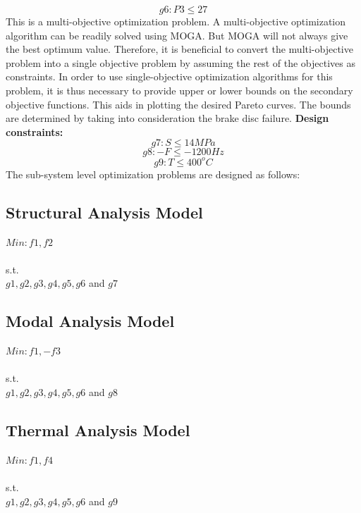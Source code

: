 \documentclass[12pt]{article}
\begin{document}
\begin{equation}
g6: P3 \le 27
\end{equation}
This is a multi-objective optimization problem. A multi-objective optimization algorithm can be readily solved using MOGA. But MOGA will not always give the best optimum value. Therefore, it is beneficial to convert the multi-objective problem into a single objective problem by assuming the rest of the objectives as constraints. In order to use single-objective optimization algorithms for this problem, it is thus necessary to provide upper or lower bounds on the secondary objective functions. This aids in plotting the desired Pareto curves. The bounds are determined by taking into consideration the brake disc failure.\newline\newline
\textbf{Design constraints:} 
\begin{equation}
g7: S \le 14 MPa
\label{7}
\end{equation}
\begin{equation}
g8: -F \le -1200 Hz
\label{8}
\end{equation}
\begin{equation}
g9: T \le 400^{o}C
\label{9}
\end{equation}
The sub-system level optimization problems are designed as follows:
\subsection{Structural Analysis Model}
$Min: f1, f2$\\\\
s.t.\\  $g1, g2, g3, g4, g5, g6$ and $g7$
\subsection{Modal Analysis Model}
$Min: f1, -f3$\\\\
s.t.\\  $g1, g2, g3, g4, g5, g6$ and $g8$
\subsection{Thermal Analysis Model}
$Min: f1, f4$\\\\
s.t.\\  $g1, g2, g3, g4, g5, g6$ and $g9$
\end{document}
